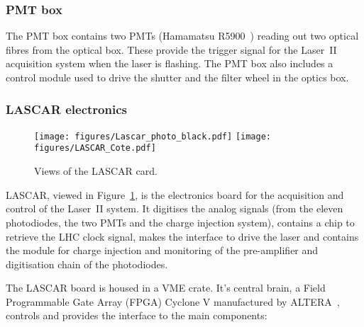\subsubsection*{PMT box}

The PMT box contains two PMTs (Hamamatsu R5900~\cite{ref:pmt}) reading out two optical fibres from the optical box. These provide the trigger signal for the Laser~II acquisition system when the laser is flashing. The PMT box also includes a control module used to drive the shutter and the filter wheel in the optics box.

\subsubsection*{LASCAR electronics}

\begin{figure}
\centering
\texttt{[image: figures/Lascar\_photo\_black.pdf]}\quad
\texttt{[image: figures/LASCAR\_Cote.pdf]}
\caption{Views of the LASCAR card.}\label{fig:laslascar}
\end{figure}


LASCAR, viewed in Figure~\ref{fig:laslascar}, is the electronics board for the acquisition and control of the Laser~II system. It digitises the analog signals (from the eleven photodiodes, the two PMTs and the charge injection system), contains a chip to retrieve the LHC clock signal, makes the interface to drive the laser and contains the module for charge injection and monitoring of the pre-amplifier and digitisation chain of the photodiodes.

The LASCAR board is housed in a VME crate. It's central brain, a Field Programmable Gate Array (FPGA) Cyclone V manufactured by ALTERA~\cite{ref:altera-cyclone}, controls and provides the interface to the main components:

